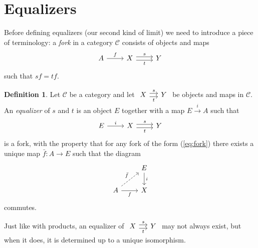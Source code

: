 \documentclass[10pt,oneside]{book}
\def\~#1{\mathscr{#1}}
\def\To#1{\xrightarrow{#1}}
\theoremstyle{plain}
\theoremstyle{definition}
\newtheorem{defn}[thm]{Definition}
\theoremstyle{remark}
\numberwithin{equation}{section}
\numberwithin{figure}{section}
\begin{document}
\section{Equalizers}

Before defining equalizers (our second kind of limit) we need to introduce a piece of terminology: a \emph{fork} in a category $\~C$ consists of objects and maps
\begin{equation}
\label{eq:fork}
    \begin{tikzcd}
        A & X & Y
        \arrow["f", from=1-1, to=1-2]
        \arrow["t"', shift right, from=1-2, to=1-3]
        \arrow["s", shift left, from=1-2, to=1-3]
    \end{tikzcd}
\end{equation}
such that $sf = tf$. 

\begin{defn}
    Let $\~C$ be a category and let $\begin{tikzcd}[column sep = small]
        X & Y
        \arrow["t"', shift right, from=1-1, to=1-2]
        \arrow["s", shift left, from=1-1, to=1-2]
    \end{tikzcd}$ be objects and maps in $\~C$. An \emph{equalizer} of $s$ and $t$ is an object $E$ together with a map $E \To{i} A$ such that 
\[\begin{tikzcd}
    E & X & Y
    \arrow["i", from=1-1, to=1-2]
    \arrow["t"', shift right, from=1-2, to=1-3]
    \arrow["s", shift left, from=1-2, to=1-3]
\end{tikzcd}\]
is a fork, with the property that for any fork of the form (\ref{eq:fork}) there exists a unique map $\bar{f}: A \to E$ such that the diagram
\[\begin{tikzcd}
    & E \\
    A & X
    \arrow["f"', from=2-1, to=2-2]
    \arrow["{\bar{f}}", dashed, from=2-1, to=1-2]
    \arrow["i", from=1-2, to=2-2]
\end{tikzcd}\]
commutes.
\end{defn}
Just like with products, an equalizer of $\begin{tikzcd}[column sep = small]
        X & Y
        \arrow["t"', shift right, from=1-1, to=1-2]
        \arrow["s", shift left, from=1-1, to=1-2]
    \end{tikzcd}$ may not always exist, but when it does, it is determined up to a unique isomorphism. 
\end{document}
